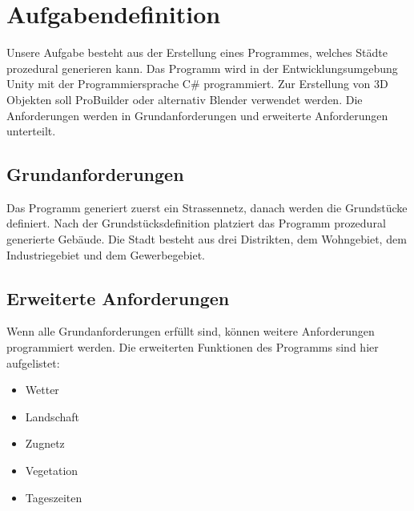 \section{Aufgabendefinition}
Unsere Aufgabe besteht aus der Erstellung eines Programmes, welches Städte prozedural generieren kann. Das Programm wird in der Entwicklungsumgebung Unity mit der Programmiersprache C\# programmiert. Zur Erstellung von 3D Objekten soll ProBuilder oder alternativ Blender verwendet werden. Die Anforderungen werden in Grundanforderungen und erweiterte Anforderungen unterteilt.

\subsection{Grundanforderungen}
Das Programm generiert zuerst ein Strassennetz, danach werden die Grundstücke definiert. Nach der Grundstücksdefinition platziert das Programm prozedural generierte Gebäude. Die Stadt besteht aus drei Distrikten, dem Wohngebiet, dem Industriegebiet und dem Gewerbegebiet. 

\subsection{Erweiterte Anforderungen}
Wenn alle Grundanforderungen erfüllt sind, können weitere Anforderungen programmiert werden. Die erweiterten Funktionen des Programms sind hier aufgelistet:
\begin{itemize}
\item Wetter
\item Landschaft
\item Zugnetz
\item Vegetation
\item Tageszeiten
\end{itemize}

